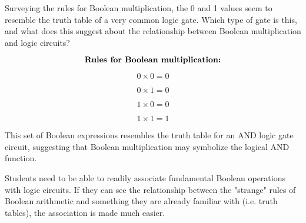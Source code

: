 

Surveying the rules for Boolean multiplication, the 0 and 1 values seem to resemble the truth table of a very common logic gate.  Which type of gate is this, and what does this suggest about the relationship between Boolean multiplication and logic circuits?

$$\hbox{\bf{Rules for Boolean multiplication:}}$$

$$0 \times 0 = 0$$

$$0 \times 1 = 0$$

$$1 \times 0 = 0$$

$$1 \times 1 = 1$$







This set of Boolean expressions resembles the truth table for an AND logic gate circuit, suggesting that Boolean multiplication may symbolize the logical AND function.







Students need to be able to readily associate fundamental Boolean operations with logic circuits.  If they can see the relationship between the "strange" rules of Boolean arithmetic and something they are already familiar with (i.e. truth tables), the association is made much easier.




